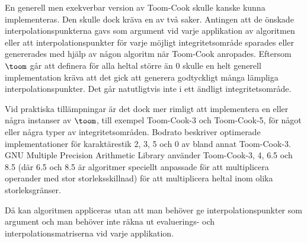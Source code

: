 En generell men exekverbar version av Toom-Cook skulle kanske kunna implementeras. Den skulle dock
kräva en av två saker. Antingen att de önskade interpolationspunkterna gavs som argument vid varje 
applikation av algoritmen eller att interpolationspunkter för varje möjligt integritetsområde
sparades eller genererades med hjälp av någon algoritm när Toom-Cook anropades. Eftersom 
$\toom$ går att definera för alla heltal större än 0 skulle en helt generell implementation 
kräva att det gick att generera godtyckligt många lämpliga interpolationspunkter. Det går 
natutligtvis inte i ett ändligt integritetsområde. 

Vid praktiska tillämpningar är det dock mer rimligt att implementera en eller några 
instanser av $\toom$, till exempel Toom-Cook-3 och Toom-Cook-5, för något eller några 
typer av
integritetsområden. Bodrato\cite{bodrato2007a}\cite{bodrato2007towards}\cite{bodrato2007b}
beskriver optimerade implementationer för karaktärestik 2, 3, 5 och 0 av bland 
annat Toom-Cook-3. GNU
Multiple Precision
Arithmetic Library använder Toom-Cook-3, 4, 6.5 och 8.5 
(där 6.5 och 8.5 är algoritmer speciellt anpassade för att multiplicera operander
med stor storleksskillnad) för att
multiplicera heltal inom olika storleksgränser.

Då kan algoritmen appliceras utan att man behöver ge interpolationspunkter som 
argument och man behöver inte räkna ut evaluerings- och interpolationsmatriserna
vid varje applikation.